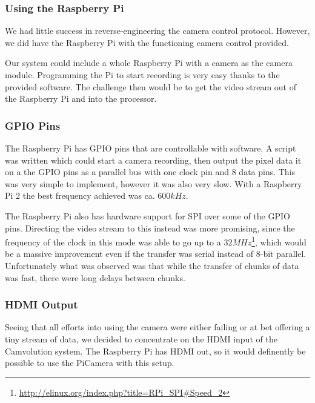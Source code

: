 \subsubsection{Using the Raspberry Pi}
We had little success in reverse-engineering the camera control protocol.
However, we did have the Raspberry Pi with the functioning camera control provided.

Our system could include a whole Raspberry Pi with a camera as the camera module.
Programming the Pi to start recording is very easy thanks to the provided software.
The challenge then would be to get the video stream out of the Raspberry Pi and into the processor.

\subsubsection{GPIO Pins}
The Raspberry Pi has GPIO pins that are controllable with software.
A script was written which could start a camera recording,
then output the pixel data it on a the GPIO pins as a parallel bus with one clock pin and 8 data pins.
This was very simple to implement, however it was also very slow.
With a Raspberry Pi 2 the best frequency achieved was ca. $600kHz$.

The Raspberry Pi also has hardware support for SPI over some of the GPIO pins.
Directing the video stream to this instead was more promising,
since the frequency of the clock in this mode was able to go up to a $32MHz$\footnote{\url{http://elinux.org/index.php?title=RPi\_SPI\#Speed\_2}},
which would be a massive improvement even if the transfer was serial instead of 8-bit parallel.
Unfortunately what was observed was that while the transfer of chunks of data was fast,
there were long delays between chunks.

\subsubsection{HDMI Output}
Seeing that all efforts into using the camera were either failing or at bet offering a tiny stream of data,
we decided to concentrate on the HDMI input of the Camvolution system.
The Raspberry Pi has HDMI out, so it would definently be possible to use the PiCamera with this setup.

